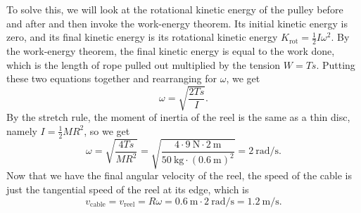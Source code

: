 \documentclass[../classical_mechanics.tex]{subfiles}
\begin{document}
\begin{example}
            To solve this, we will look at the rotational kinetic energy of the pulley before and after and then invoke the work-energy theorem.
            Its initial kinetic energy is zero, and its final kinetic energy is its rotational kinetic energy $K_\text{rot}=\frac{1}{2}I\omega^2$.
            By the work-energy theorem, the final kinetic energy is equal to the work done, which is the length of rope pulled out multiplied by the tension $W=Ts$.
            Putting these two equations together and rearranging for $\omega$, we get
            \begin{equation}
                \omega=\sqrt{\frac{2Ts}{I}}.
            \end{equation}
            By the stretch rule, the moment of inertia of the reel is the same as a thin disc, namely $I=\frac{1}{2}MR^2$, so we get
            \begin{equation}
                \omega=\sqrt{\frac{4Ts}{MR^2}}=\sqrt{\frac{4\cdot\qty{9}{\newton}\cdot\qty{2}{\meter}}{\qty{50}{\kilogram}\cdot(\qty{0.6}{\meter})^2}}=\qty{2}{\radian\per\second}.
            \end{equation}
            Now that we have the final angular velocity of the reel, the speed of the cable is just the tangential speed of the reel at its edge, which is
            \begin{equation}
                v_\text{cable}=v_\text{reel}=R\omega=\qty{0.6}{\meter}\cdot\qty{2}{\radian\per\second}=\qty{1.2}{\meter\per\second}.
            \end{equation}
        \end{example}
\end{document}
